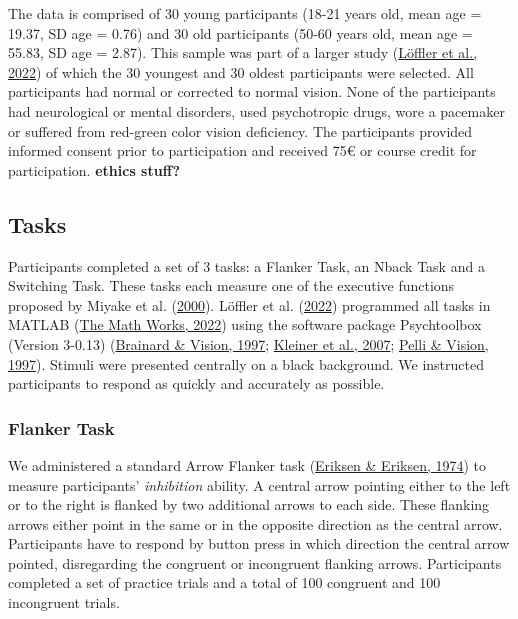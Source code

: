 \documentclass[
  man]{apa7}
\begin{document}
The data is comprised of 30 young participants (18-21 years old, mean age = 19.37, SD age = 0.76) and 30 old participants (50-60 years old, mean age = 55.83, SD age = 2.87). This sample was part of a larger study (\protect\hyperlink{ref-loffler2022common}{Löffler et al., 2022}) of which the 30 youngest and 30 oldest participants were selected. All participants had normal or corrected to normal vision. None of the participants had neurological or mental disorders, used psychotropic drugs, wore a pacemaker or suffered from red-green color vision deficiency. The participants provided informed consent prior to participation and received 75€ or course credit for participation. \textbf{ethics stuff?}

\hypertarget{tasks}{%
\subsection{Tasks}\label{tasks}}

Participants completed a set of 3 tasks: a Flanker Task, an Nback Task and a Switching Task. These tasks each measure one of the executive functions proposed by Miyake et al. (\protect\hyperlink{ref-miyake2000unity}{2000}). Löffler et al. (\protect\hyperlink{ref-loffler2022common}{2022}) programmed all tasks in MATLAB (\protect\hyperlink{ref-matlab2022b}{The Math Works, 2022}) using the software package Psychtoolbox (Version 3-0.13) (\protect\hyperlink{ref-brainard1997psychophysics}{Brainard \& Vision, 1997}; \protect\hyperlink{ref-kleiner2007psychtoolbox}{Kleiner et al., 2007}; \protect\hyperlink{ref-pelli1997videotoolbox}{Pelli \& Vision, 1997}). Stimuli were presented centrally on a black background. We instructed participants to respond as quickly and accurately as possible.

\hypertarget{flanker-task}{%
\subsubsection{Flanker Task}\label{flanker-task}}

We administered a standard Arrow Flanker task (\protect\hyperlink{ref-eriksen1974effects}{Eriksen \& Eriksen, 1974}) to measure participants' \emph{inhibition} ability. A central arrow pointing either to the left or to the right is flanked by two additional arrows to each side. These flanking arrows either point in the same or in the opposite direction as the central arrow. Participants have to respond by button press in which direction the central arrow pointed, disregarding the congruent or incongruent flanking arrows. Participants completed a set of practice trials and a total of 100 congruent and 100 incongruent trials.
\end{document}
